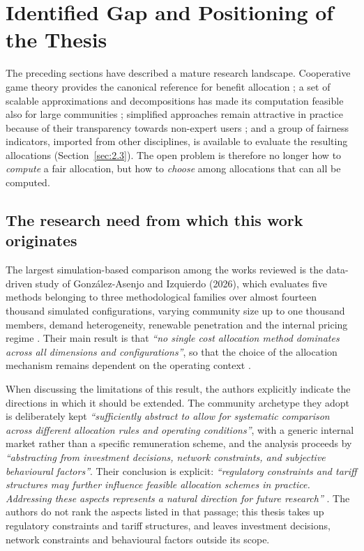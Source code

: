 \section{Identified Gap and Positioning of the Thesis}
\label{sec:gaps}

The preceding sections have described a mature research landscape. Cooperative game theory provides the canonical reference for benefit allocation \cite{shapley1953, moncecchi2020}; a set of scalable approximations and decompositions has made its computation feasible also for large communities \cite{castro2009, cremers2023, alonsopedrero2024, ferrucci2025}; simplified approaches remain attractive in practice because of their transparency towards non-expert users \cite{kulmala2021, fioriti2023}; and a group of fairness indicators, imported from other disciplines, is available to evaluate the resulting allocations (Section~\ref{sec:2.3}). The open problem is therefore no longer how to \emph{compute} a fair allocation, but how to \emph{choose} among allocations that can all be computed.

\subsection*{The research need from which this work originates}

The largest simulation-based comparison among the works reviewed is the data-driven study of González-Asenjo and Izquierdo (2026), which evaluates five methods belonging to three methodological families over almost fourteen thousand simulated configurations, varying community size up to one thousand members, demand heterogeneity, renewable penetration and the internal pricing regime \cite{gonzalezAsenjo2026, schmeidler1969}. Their main result is that \textit{``no single cost allocation method dominates across all dimensions and configurations''}, so that the choice of the allocation mechanism remains dependent on the operating context \cite{gonzalezAsenjo2026}.

When discussing the limitations of this result, the authors explicitly indicate the directions in which it should be extended. The community archetype they adopt is deliberately kept \textit{``sufficiently abstract to allow for systematic comparison across different allocation rules and operating conditions''}, with a generic internal market rather than a specific remuneration scheme, and the analysis proceeds by \textit{``abstracting from investment decisions, network constraints, and subjective behavioural factors''}. Their conclusion is explicit: \textit{``regulatory constraints and tariff structures may further influence feasible allocation schemes in practice. Addressing these aspects represents a natural direction for future research''} \cite{gonzalezAsenjo2026}. The authors do not rank the aspects listed in that passage; this thesis takes up regulatory constraints and tariff structures, and leaves investment decisions, network constraints and behavioural factors outside its scope.

